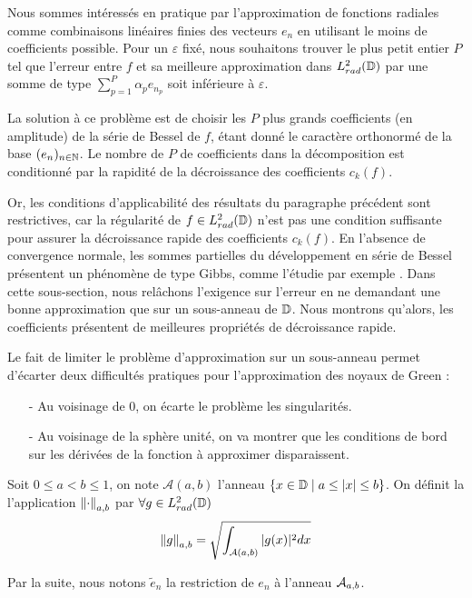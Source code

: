 \documentclass[11pt,a4paper]{article}
\begin{document}
Nous sommes intéressés en pratique par l'approximation de fonctions radiales comme combinaisons linéaires finies des vecteurs $e_n$ en utilisant le moins de coefficients possible. Pour un $\varepsilon$ fixé, nous souhaitons trouver le plus petit entier $P$ tel que l'erreur entre $f$ et sa meilleure approximation dans $L^2_{rad}(\mathbb{D})$ par une somme de type $\sum_{p=1}^P\alpha_p e_{n_p}$ soit inférieure à $\varepsilon$. 

La solution à ce problème est de choisir les $P$ plus grands coefficients (en amplitude) de la série de Bessel de $f$, étant donné le caractère orthonormé de la base $(e_n)_{n\in\mathbb{N}}$. Le nombre de $P$ de coefficients dans la décomposition est conditionné par la rapidité de la décroissance des coefficients $c_k(f)$. 

Or, les conditions d'applicabilité des résultats du paragraphe précédent sont restrictives, car la régularité de $f\in L^2_{rad}(\mathbb{D})$ n'est pas une condition suffisante pour assurer la décroissance rapide des coefficients $c_k(f)$. En l'absence de convergence normale, les sommes partielles du développement en série de Bessel présentent un phénomène de type Gibbs, comme l'étudie par exemple \cite{gray1992computer}. 
Dans cette sous-section, nous relâchons l'exigence sur l'erreur en ne demandant une bonne approximation que sur un sous-anneau de $\mathbb{D}$. Nous montrons qu'alors, les coefficients présentent de meilleures propriétés de décroissance rapide. 

\begin{Rem} Le fait de limiter le problème d'approximation sur un sous-anneau permet d'écarter deux difficultés pratiques pour l'approximation des noyaux de Green : 
\begin{itemize}
\item[-] Au voisinage de 0, on écarte le problème les singularités. 
\item[-] Au voisinage de la sphère unité, on va montrer que les conditions de bord sur les dérivées de la fonction à approximer disparaissent.
\end{itemize}
\end{Rem}

\begin{Def} Soit $0 \leq a < b \leq 1$, on note $\mathcal{A}(a,b)$ l'anneau $\left\{x\in \mathbb{D}\mathrel{}\middle|\mathrel{}a \leq |x| \leq b\right\}$. On définit la l'application $\left\|\cdot \right\|_{a,b}$ par $\forall g \in L^2_{rad}(\mathbb{D}) $ \[\left\|g\right\|_{a,b} = \sqrt{\int_{\mathcal{A}(a,b)}|g(x)|^2dx}\]
\end{Def}
Par la suite, nous notons $\tilde{e}_n$ la restriction de $e_n$ à l'anneau $\mathcal{A}_{a,b}$. 
\end{document}
